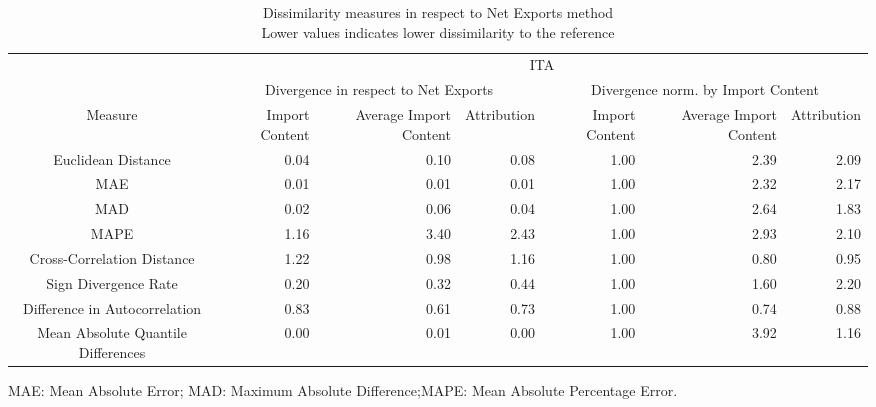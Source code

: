 \begin{table}[t]
\caption*{
{\large Dissimilarity measures in respect to Net Exports method} \\ 
{\small Lower values indicates lower dissimilarity to the reference}
} 
\fontsize{15.0pt}{18.0pt}\selectfont
\begin{tabular*}{\linewidth}{@{\extracolsep{\fill}}crrrrrr}
\toprule
 & \multicolumn{6}{c}{ITA} \\ 
\cmidrule(lr){2-7}
 & \multicolumn{3}{c}{Divergence in respect to Net Exports} & \multicolumn{3}{c}{Divergence norm. by Import Content} \\ 
\cmidrule(lr){2-4} \cmidrule(lr){5-7}
Measure & Import Content & Average Import Content & Attribution & Import Content & Average Import Content & Attribution \\ 
\midrule\addlinespace[2.5pt]
Euclidean Distance & 0.04 & 0.10 & 0.08 & 1.00 & 2.39 & 2.09 \\ 
MAE & 0.01 & 0.01 & 0.01 & 1.00 & 2.32 & 2.17 \\ 
MAD & 0.02 & 0.06 & 0.04 & 1.00 & 2.64 & 1.83 \\ 
MAPE & 1.16 & 3.40 & 2.43 & 1.00 & 2.93 & 2.10 \\ 
Cross-Correlation Distance & 1.22 & 0.98 & 1.16 & 1.00 & 0.80 & 0.95 \\ 
Sign Divergence Rate & 0.20 & 0.32 & 0.44 & 1.00 & 1.60 & 2.20 \\ 
Difference in Autocorrelation & 0.83 & 0.61 & 0.73 & 1.00 & 0.74 & 0.88 \\ 
Mean Absolute Quantile Differences & 0.00 & 0.01 & 0.00 & 1.00 & 3.92 & 1.16 \\ 
\bottomrule
\end{tabular*}
\begin{minipage}{\linewidth}
MAE: Mean Absolute Error; MAD: Maximum Absolute Difference;MAPE: Mean Absolute Percentage Error.\\
\end{minipage}
\end{table}

